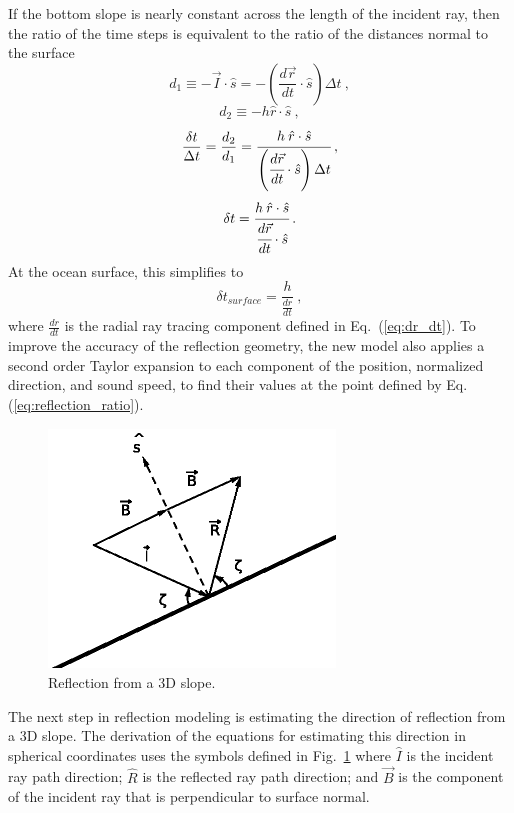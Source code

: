 \documentclass{ws-jca}
\newcommand{\threeD}{3\nobreakdash\textendash D }	%
\begin{document}
If the bottom slope is nearly constant across the length of the incident
ray, then the ratio of the time steps is equivalent to the ratio of the
distances normal to the surface
\begin{equation}
	d_1 \equiv - \vec{I} \cdot \hat{s} 
		= - \left( \frac{d\vec{r}}{dt} \cdot \hat{s} \right) \Delta t \:,
	\label{eq:reflection_d1}
\end{equation}
\begin{equation}
	d_2 \equiv - h \hat{r} \cdot \hat{s} \:,
	\label{eq:reflection_d2}
\end{equation}
\begin{equation}
	\frac{\delta t}{\Delta t} = \frac{d_2}{d_1} 
		= \cfrac{h \: \hat{r} \cdot \hat{s}}{\left( \cfrac{d\vec{r}}{dt} 
		\cdot \hat{s} \right) \Delta t} \:,
	\label{eq:reflection_ratio}
\end{equation}
\begin{equation}
	\delta t = \cfrac{h \: \hat{r} \cdot \hat{s}}{\cfrac{d\vec{r}}{dt} \cdot \hat{s}} \:.
	\label{eq:reflection_time_bottom}
\end{equation}
At the ocean surface, this simplifies to
\begin{equation}
	\delta t_{surface} = \frac{h}{\frac{dr}{dt}} \:,
	\label{eq:reflection_time_surface}
\end{equation}
where \(\frac{dr}{dt}\) is the radial ray tracing component defined in
Eq.~(\ref{eq:dr_dt}).
To improve the accuracy of the reflection geometry, the new model also
applies a second order Taylor expansion to each component of the position,
normalized direction, and sound speed, to find their values at the point
defined by Eq. (\ref{eq:reflection_ratio}).

\begin{figure}[th]
	\centerline{\includegraphics[width=3in]{EstDirectionCollision.eps}} 
	\vspace*{8pt}
	\caption{Reflection from a \threeD slope.}
	\label{fig:reflect3d}
\end{figure}
The next step in reflection modeling is estimating the direction of
reflection from a \threeD slope. The derivation of the equations for
estimating this direction in spherical coordinates uses the
symbols defined in Fig.~\ref{fig:reflect3d} 
where
\(\hat{I}\) is the incident ray path direction;
\(\hat{R}\) is the reflected ray path direction; and
\(\vec{B}\) is the component of the incident ray that is perpendicular to surface normal.
\end{document}
